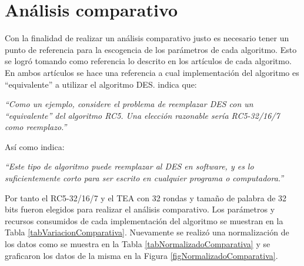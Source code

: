 \clearpage
\section{Análisis comparativo}
Con la finalidad de realizar un análisis comparativo justo es necesario tener un punto de referencia para la escogencia de los parámetros de cada algoritmo. Esto se logró tomando como referencia lo descrito en los artículos de cada algoritmo. En ambos artículos se hace una referencia a cual implementación del algoritmo es ``equivalente'' a utilizar el algoritmo DES. \cite{rivest} indica que:
\begin{center}
    \begin{minipage}{0.9\linewidth}
        \vspace{5pt}%
        {\small
            \emph{``Como un ejemplo, considere el problema de reemplazar DES con un ``equivalente'' del algoritmo RC5. Una elección razonable sería RC5-32/16/7 como reemplazo.''}
        }
 		\vspace{5pt}%
    \end{minipage}
\end{center}

\begin{flushleft}
Así como \cite{tea} indica:
\end{flushleft}
\begin{center}
    \begin{minipage}{0.9\linewidth}
        \vspace{5pt}%
        {\small
            \emph{``Este tipo de algoritmo puede reemplazar al DES en software, y es lo suficientemente corto para ser escrito en cualquier programa o computadora.''}
        }
 		\vspace{5pt}%
    \end{minipage}
\end{center}
 
Por tanto el RC5-32/16/7 y el TEA con 32 rondas y tamaño de palabra de 32 bits fueron elegidos para realizar el análisis comparativo. Los parámetros y recursos consumidos de cada implementación del algoritmo se muestran en la Tabla \ref{tabVariacionComparativa}. Nuevamente se realizó una normalización de los datos como se muestra en la Tabla \ref{tabNormalizadoComparativa} y se graficaron los datos de la misma en la Figura \ref{figNormalizadoComparativa}. 

